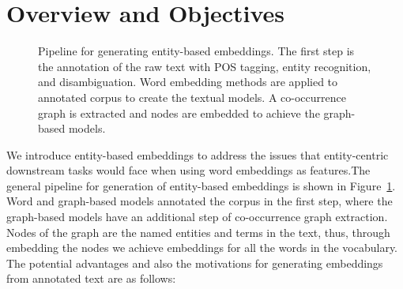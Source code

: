 \section{Overview and Objectives}\label{sec:entity_overview}
\begin{figure}
\centering 
\resizebox{0.97\textwidth}{0.32\textwidth}{      

}
\caption{Pipeline for generating entity-based embeddings. The first step is the annotation of the raw text with POS tagging, entity recognition, and disambiguation. Word embedding methods are applied to annotated corpus to create the textual models. A co-occurrence graph is extracted and nodes are embedded to achieve the graph-based models.}
\label{fig:entity_emebddings_pipline}
\end{figure}
We introduce entity-based embeddings to address the issues that entity-centric downstream tasks would face when using word embeddings as features.The general pipeline for generation of entity-based embeddings is shown in Figure~\ref{fig:entity_emebddings_pipline}. Word and graph-based models annotated the corpus in the first step, where the graph-based models have an additional step of co-occurrence graph extraction. Nodes of the graph are the named entities and terms in the text, thus, through embedding the nodes we achieve embeddings for all the words in the vocabulary. \\
The potential advantages and also the motivations for generating embeddings from annotated text are as follows: 
